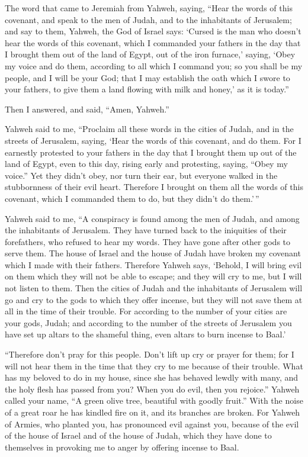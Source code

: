  The word that came to Jeremiah from Yahweh, saying,
 ``Hear the words of this covenant, and speak to the men
of Judah, and to the inhabitants of Jerusalem;  and say to
them, Yahweh, the God of Israel says: `Cursed is the man who doesn't
hear the words of this covenant,  which I commanded your
fathers in the day that I brought them out of the land of Egypt, out of
the iron furnace,' saying, `Obey my voice and do them, according to all
which I command you; so you shall be my people, and I will be your God;
 that I may establish the oath which I swore to your
fathers, to give them a land flowing with milk and honey,' as it is
today.''

Then I answered, and said, ``Amen, Yahweh.''

 Yahweh said to me, ``Proclaim all these words in the
cities of Judah, and in the streets of Jerusalem, saying, `Hear the
words of this covenant, and do them.  For I earnestly
protested to your fathers in the day that I brought them up out of the
land of Egypt, even to this day, rising early and protesting, saying,
``Obey my voice.''  Yet they didn't obey, nor turn their
ear, but everyone walked in the stubbornness of their evil heart.
Therefore I brought on them all the words of this covenant, which I
commanded them to do, but they didn't do them.'\,''

 Yahweh said to me, ``A conspiracy is found among the men
of Judah, and among the inhabitants of Jerusalem.  They
have turned back to the iniquities of their forefathers, who refused to
hear my words. They have gone after other gods to serve them. The house
of Israel and the house of Judah have broken my covenant which I made
with their fathers.  Therefore Yahweh says, `Behold, I
will bring evil on them which they will not be able to escape; and they
will cry to me, but I will not listen to them.  Then the
cities of Judah and the inhabitants of Jerusalem will go and cry to the
gods to which they offer incense, but they will not save them at all in
the time of their trouble.  For according to the number
of your cities are your gods, Judah; and according to the number of the
streets of Jerusalem you have set up altars to the shameful thing, even
altars to burn incense to Baal.'

 ``Therefore don't pray for this people. Don't lift up
cry or prayer for them; for I will not hear them in the time that they
cry to me because of their trouble.  What has my beloved
to do in my house, since she has behaved lewdly with many, and the holy
flesh has passed from you? When you do evil, then you rejoice.''
 Yahweh called your name, ``A green olive tree, beautiful
with goodly fruit.'' With the noise of a great roar he has kindled fire
on it, and its branches are broken.  For Yahweh of
Armies, who planted you, has pronounced evil against you, because of the
evil of the house of Israel and of the house of Judah, which they have
done to themselves in provoking me to anger by offering incense to Baal.

